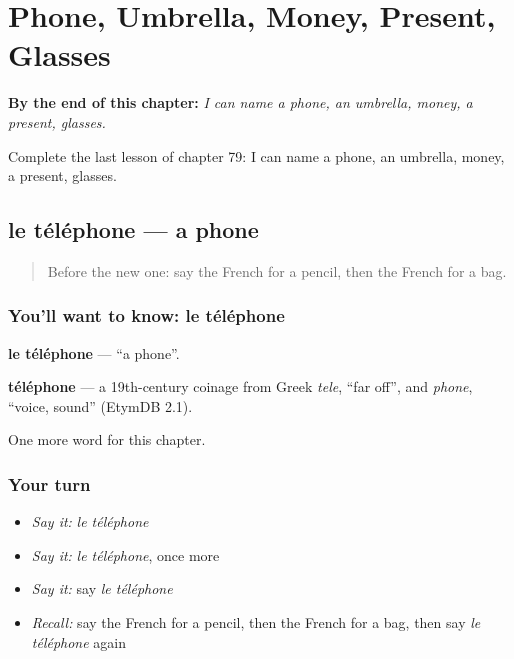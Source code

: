 
\chapter{Phone, Umbrella, Money, Present, Glasses}
\label{ch:fr-phone-umbrella-money-present-glasses}

\begin{chapteropening}
\textbf{By the end of this chapter:} \emph{I can name a phone, an umbrella, money, a present, glasses.}

Complete the last lesson of chapter 79: I can name a phone, an umbrella, money, a present, glasses.
\end{chapteropening}

\section[le téléphone]{le téléphone — a phone}

\label{lesson:FR-C79-telephone}



\begin{quote}
Before the new one: say the French for a pencil, then the French for a bag.
\end{quote}

\subsection*{You'll want to know: le téléphone}
\textbf{le téléphone} — \textquotedblleft{}a phone\textquotedblright{}.

\begin{cousinweb}
\textbf{téléphone} — a 19th-century coinage from Greek \emph{tele}, \textquotedblleft{}far off\textquotedblright{}, and \emph{phone}, \textquotedblleft{}voice, sound\textquotedblright{} (EtymDB 2.1).
\end{cousinweb}

\begin{grammarlens}[title={What you've built}]
One more word for this chapter.
\end{grammarlens}

\subsection*{Your turn}
\begin{itemize}
\raggedright
  \item \emph{Say it:} \emph{le téléphone}
  \item \emph{Say it:} \emph{le téléphone}, once more
  \item \emph{Say it:} say \emph{le téléphone}
  \item \emph{Recall:} say the French for a pencil, then the French for a bag, then say \emph{le téléphone} again
\end{itemize}

